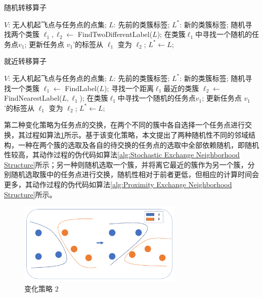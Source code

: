 \begin{algorithm}[!htbp]
  \caption{随机转移算子} %
  \label{alg:Stochastic Transfer Neighborhood Structure}
  \begin{algorithmic}[1]
    \REQUIRE
      $V$: 无人机起飞点与任务点的点集;
      $L$: 先前的类簇标签;
    \ENSURE
      $L^*$: 新的类簇标签;
    \STATE 随机寻找两个类簇 $\ell_1, \ell_2 \gets$ FindTwoDifferentLabel($L$);
    \STATE 在类簇$\ell_1$中寻找一个随机的任务点$v_1$;
    \STATE 更新任务点 $v_1$'的标签从 $\ell_1$ 变为 $\ell_2$;
    \STATE $L^* \gets L$;
  \end{algorithmic}
\end{algorithm}

\begin{algorithm}[!htbp]
  \caption{就近转移算子} %
  \label{alg:Proximity Transfer Neighborhood Structure}
  \begin{algorithmic}[1]
    \REQUIRE
      $V$: 无人机起飞点与任务点的点集;
      $L$: 先前的类簇标签;
    \ENSURE
      $L^*$: 新的类簇标签;
    \STATE 随机寻找一个类簇 $\ell_1 \gets$ FindLabel($L$);
    \STATE 寻找一个距离$\ell_1$最近的类簇 $\ell_2 \gets$ FindNearestLabel($L, \ell_1$);
    \STATE 在类簇$\ell_1$中寻找一个随机的任务点$v_1$;
    \STATE 更新任务点 $v_1$'的标签从 $\ell_1$ 变为 $\ell_2$;
    \STATE $L^* \gets L$;
  \end{algorithmic}
\end{algorithm}

第二种变化策略为任务点的交换，在两个不同的簇中各自选择一个任务点进行交换，其过程如算法\ref{fig:conversion_way_2}所示。基于该变化策略，本文提出了两种随机性不同的邻域结构，一种在两个簇的选取及各自的待交换的任务点的选取中全部依赖随机，即随机性较高，其动作过程的伪代码如算法\ref{alg:Stochastic Exchange Neighborhood Structure}所示；另一种则随机选取一个簇，并将离它最近的簇作为另一个簇，分别随机选取簇中的任务点进行交换，随机性相对于前者更低，但相应的计算时间会更多，其动作过程的伪代码如算法\ref{alg:Proximity Exchange Neighborhood Structure}所示。

\begin{figure}[!htbp]
    \centering
    \includegraphics[width=0.7\textwidth]{images/全局邻域2_en.png}
    \caption{变化策略 2}
    \label{fig:conversion_way_2}
\end{figure}

